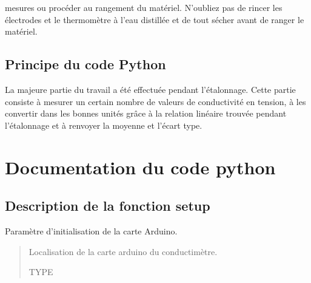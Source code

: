 \documentclass[letterpaper,10pt,french]{sphinxmanual}
\begin{document}
\sphinxAtStartPar
mesures ou procéder au rangement du matériel. N’oubliez pas de rincer les électrodes et le
thermomètre à l’eau distillée et de tout sécher avant de ranger le matériel.


\section{Principe du code Python}
\label{\detokenize{Mesures:principe-du-code-python}}
\sphinxAtStartPar
La majeure partie du travail a été effectuée pendant l’étalonnage. Cette partie consiste à mesurer un certain nombre de valeurs de conductivité en tension, à les convertir dans les bonnes unités grâce à la relation linéaire trouvée pendant l’étalonnage et à renvoyer la moyenne et l’écart type.

\sphinxstepscope


\chapter{Documentation du code python}
\label{\detokenize{Documentation:documentation-du-code-python}}\label{\detokenize{Documentation::doc}}

\section{Description de la fonction setup}
\label{\detokenize{Documentation:description-de-la-fonction-setup}}

\begin{fulllineitems}
\label{\detokenize{Documentation:ADNI_ProgrammePython.setup}}
\pysigstartsignatures
{}
\pysigstopsignatures
\sphinxAtStartPar
Paramètre d’initialisation de la carte Arduino.
\begin{quote}\begin{description}
\sphinxAtStartPar
{} \textendash{} Localisation de la carte arduino du conductimètre.

\sphinxAtStartPar
TYPE

\end{description}\end{quote}

\end{fulllineitems}
\end{document}
